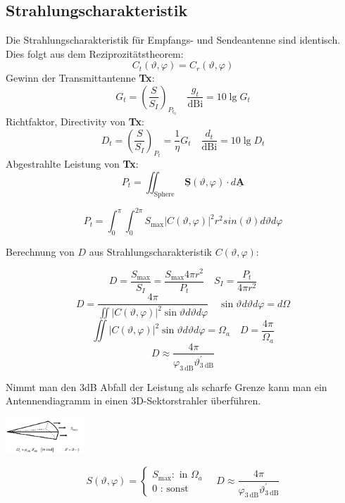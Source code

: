 \documentclass[english]{latex4ei/latex4ei_sheet}
\renewcommand{\vec}[1]{\underline{\boldsymbol{#1}}}
\begin{document}
\begin{sectionbox}
\subsection{Strahlungscharakteristik}
Die Strahlungscharakteristik für Empfangs- und Sendeantenne sind identisch. Dies folgt aus dem Reziprozitätstheorem:
$$
C_{t}(\vartheta, \varphi)=C_{r}(\vartheta, \varphi)
$$
Gewinn der Transmittantenne \textbf{Tx}: 
$$G_{t}=\left(\frac{S}{S_{I}}\right)_{P_{t_{0}}}
\quad 
\frac{g_{t}}{\mathrm{dBi}}=10 \lg G_{t}
$$
Richtfaktor, Directivity von \textbf{Tx}:
$$
D_{t}=\left(\frac{S}{S_{I}}\right)_{P_{t}}=\frac{1}{\eta} G_{t}
\quad 
\frac{d_{t}}{\mathrm{dBi}}=10 \lg D_{t}
$$
Abgestrahlte Leistung von \textbf{Tx}:
$$
P_{t}=\iint_{\text {Sphere }} \vec{S}(\vartheta, \varphi) \cdot d \vec{A}
$$
\begin{emphbox}
$$
P_{t}= \int_{0}^{\pi}\int_{0}^{2\pi} S_{\text{max}} |C(\vartheta, \varphi)|^2 r^2 sin(\vartheta) d\vartheta d\varphi
$$
\end{emphbox}
Berechnung von $D$ aus Strahlungscharakteristik $C( \vartheta , \varphi)$:
\begin{emphbox}
$$
D=\frac{S_{\max }}{S_{I}}=\frac{S_{\max } 4 \pi r^{2}}{P_{t}} \quad S_{I}=\frac{P_{t}}{4 \pi r^{2}}
$$
$$
D=\frac{4 \pi}{\iint|C(\vartheta, \varphi)|^{2} \sin \vartheta d \vartheta d \varphi} \quad \sin \vartheta d \vartheta d \varphi=d \Omega$$
$$ \iint|C(\vartheta, \varphi)|^{2} \sin \vartheta d \vartheta d \varphi=\Omega_{a}\quad
D=\frac{4 \pi}{\Omega_{a}}
$$
$$
D \approx \frac{4 \pi}{\varphi_{3 \mathrm{~dB}} \vartheta_{3 \mathrm{~dB}}^{\prime}}
$$
\end{emphbox}
\end{sectionbox}                         
\begin{sectionbox}
Nimmt man den $3$dB Abfall der Leistung als scharfe Grenze kann man ein Antennendiagramm in einen 3D-Sektorstrahler überführen.
\begin{center}
	\includegraphics[width = 3cm]{./img/antenne_3d_sektor.png}
\end{center}
	
\begin{emphbox}
$$
S(\vartheta, \varphi)=\left\{\begin{array}{c}
	S_{\max }: \text { in } \Omega_{a} \\
	0 \text { : sonst }
\end{array}\right. \quad
D \approx \frac{4 \pi}{\varphi_{3 \mathrm{~dB}} \vartheta_{3 \mathrm{~dB}}^{\prime}}
$$
\end{emphbox}
\end{sectionbox}
\end{document}
